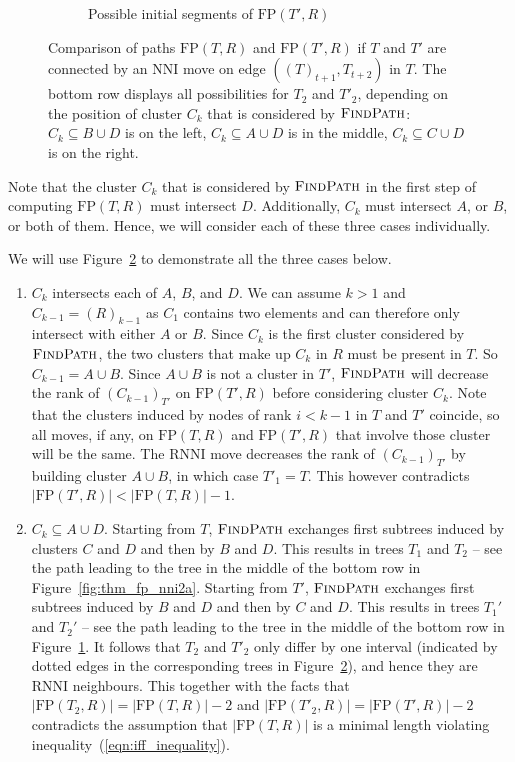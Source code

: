 \documentclass[11pt]{amsart}
\newcommand{\rnni}{\mathrm{RNNI}}
\newcommand{\findpath}{\textsc{FindPath}}
\newcommand{\nni}{\mathrm{NNI}}
\newcommand{\fp}{\mathrm{FP}}
\begin{document}
\begin{enumerate}[label = 1.{\arabic*}]
\begin{figure}[H]
\begin{subfigure}[b]{.45\textwidth}
		\vspace{12pt}
		\caption{Possible initial segments of $\fp(T', R)$}
		\label{fig:thm_fp_nni2b}
	\end{subfigure}
	\caption{Comparison of paths $\fp(T, R)$ and $\fp(T', R)$ if $T$ and $T'$ are connected by an $\nni$ move on edge $((T)_{t+1},T_{t+2})$ in $T$.
	The bottom row displays all possibilities for $T_2$ and $T'_2$, depending on the position of cluster $C_k$ that is considered by $\findpath$:
	${C_k \subseteq B \cup D}$ is on the left, ${C_k \subseteq A \cup D}$ is in the middle, ${C_k \subseteq C \cup D}$ is on the right.}
	\label{fig:thm_fp_nni}
\end{figure}

Note that the cluster $C_k$ that is considered by $\findpath$ in the first step of computing $\fp(T, R)$ must intersect $D$.
Additionally, $C_k$ must intersect $A$, or $B$, or both of them.
Hence, we will consider each of these three cases individually.

We will use Figure~\ref{fig:thm_fp_nni} to demonstrate all the three cases below.

\begin{enumerate}[label = \theenumi.\arabic*]
\item $C_k$ intersects each of $A$, $B$, and $D$.
We can assume $k > 1$ and $C_{k-1} = (R)_{k-1}$ as $C_1$ contains two elements and can therefore only intersect with either $A$ or $B$.
Since $C_k$ is the first cluster considered by $\findpath$, the two clusters that make up $C_k$ in $R$ must be present in $T$.
So $C_{k-1} = A \cup B$.
Since $A \cup B$ is not a cluster in $T'$, $\findpath$ will decrease the rank of $(C_{k-1})_{T'}$ on $\fp(T', R)$ before considering cluster $C_k$.
Note that the clusters induced by nodes of rank $i < k - 1$ in $T$ and $T'$ coincide, so all moves, if any, on $\fp(T, R)$ and $\fp(T', R)$ that involve those cluster will be the same.
The $\rnni$ move decreases the rank of $(C_{k-1})_{T'}$ by building cluster $A \cup B$, in which case $T'_1 = T$.
This however contradicts $|\fp(T',R)| < |\fp(T,R)| - 1$.

\item $C_k \subseteq A \cup D$.
\label{deep_case_details}
Starting from $T$, $\findpath$ exchanges first subtrees induced by clusters $C$ and $D$ and then by $B$ and $D$.
This results in trees $T_1$ and $T_2$ -- see the path leading to the tree in the middle of the bottom row in Figure~\ref{fig:thm_fp_nni2a}.
Starting from $T'$, $\findpath$ exchanges first subtrees induced by $B$ and $D$ and then by $C$ and $D$.
This results in trees $T_1'$ and $T_2'$ -- see the path leading to the tree in the middle of the bottom row in Figure~\ref{fig:thm_fp_nni2b}.
It follows that $T_2$ and $T'_2$ only differ by one interval (indicated by dotted edges in the corresponding trees in Figure~\ref{fig:thm_fp_nni}), and hence they are $\rnni$ neighbours.
This together with the facts that $|\fp(T_2,R)| = |\fp(T,R)|-2$ and $|\fp(T'_2,R)| = |\fp(T',R)|-2$ contradicts the assumption that $|\fp(T,R)|$ is a minimal length violating inequality~(\ref{eqn:iff_inequality}).


\end{enumerate}
\end{enumerate}
\end{document}
